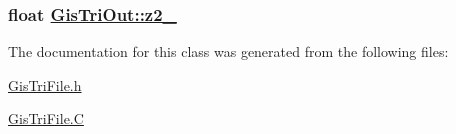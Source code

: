 \hypertarget{classGisTriOut_o8}{
\subsubsection[z2\_\-]{\setlength{\rightskip}{0pt plus 5cm}float \hyperlink{classGisTriOut_o8}{Gis\-Tri\-Out::z2\_\-}}}
\label{classGisTriOut_o8}




The documentation for this class was generated from the following files:\begin{CompactItemize}
\item 
\hyperlink{GisTriFile_8h}{Gis\-Tri\-File.h}\item 
\hyperlink{GisTriFile_8C}{Gis\-Tri\-File.C}\end{CompactItemize}
